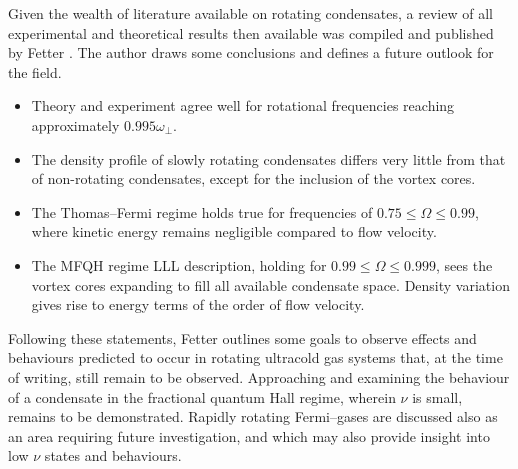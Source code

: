 Given the wealth of literature available on rotating condensates, a review of all experimental and theoretical results then available was compiled and published by Fetter \cite{BEC:Fetter_revmodphys_2009}. The author draws some conclusions and defines a future outlook for the field.
\begin{itemize}
\item Theory and experiment agree well for rotational frequencies reaching approximately $0.995\omega_{\perp}$.
\item The density profile of slowly rotating condensates differs very little from that of non-rotating condensates, except for the inclusion of the vortex cores.
\item The Thomas--Fermi regime holds true for frequencies of $0.75 \leq \Omega \leq 0.99$, where kinetic energy remains negligible compared to flow velocity.
\item The MFQH regime LLL description, holding for $0.99 \leq \Omega \leq 0.999$, sees the vortex cores expanding to fill all available condensate space. Density variation gives rise to energy terms of the order of flow velocity.
\end{itemize}
Following these statements, Fetter outlines some goals to observe effects and behaviours predicted to occur in rotating ultracold gas systems that, at the time of writing, still remain to be observed. Approaching and examining the behaviour of a condensate in the fractional quantum Hall regime, wherein $\nu$ is small, remains to be demonstrated. Rapidly rotating Fermi--gases are discussed also as an area requiring future investigation, and which may also provide insight into low $\nu$ states and behaviours.

